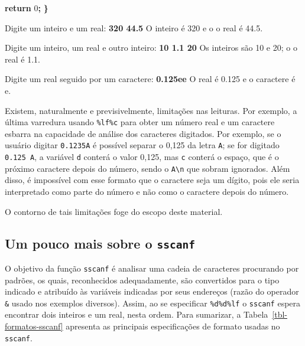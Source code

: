\documentclass[
  11pt,
  a4paper,
]{scrbook}
\newenvironment{Shaded}{\begin{snugshade}}{\end{snugshade}}
\newcommand{\ControlFlowTok}[1]{\textcolor[rgb]{0.13,0.29,0.53}{\textbf{#1}}}
\newcommand{\DecValTok}[1]{\textcolor[rgb]{0.00,0.00,0.81}{#1}}
\newcommand{\KeywordTok}[1]{\textcolor[rgb]{0.13,0.29,0.53}{\textbf{#1}}}
\newcommand{\NormalTok}[1]{#1}
\newcommand{\OperatorTok}[1]{\textcolor[rgb]{0.81,0.36,0.00}{\textbf{#1}}}
\begin{document}
\begin{Shaded}
\begin{Highlighting}[]
    \ControlFlowTok{return} \DecValTok{0}\OperatorTok{;}
\OperatorTok{\}}
\end{Highlighting}
\end{Shaded}

\begin{Shaded}
\begin{Highlighting}[]
\NormalTok{Digite um inteiro e um real: }\KeywordTok{ 320 44.5 }
\NormalTok{O inteiro é 320 e o o real é 44.5.}

\NormalTok{Digite um inteiro, um real e outro inteiro: }\KeywordTok{ 10 1.1 20 }
\NormalTok{Os inteiros são 10 e 20; o o real é 1.1.}

\NormalTok{Digite um real seguido por um caractere: }\KeywordTok{ 0.125ee }
\NormalTok{O real é 0.125 e o caractere é e.}
\end{Highlighting}
\end{Shaded}

Existem, naturalmente e previsivelmente, limitações nas leituras. Por
exemplo, a última varredura usando \texttt{\%lf\%c} para obter um número
real e um caractere esbarra na capacidade de análise dos caracteres
digitados. Por exemplo, se o usuário digitar \texttt{0.1235A} é possível
separar o 0,125 da letra \texttt{A}; se for digitado \texttt{0.125\ A},
a variável \texttt{d} conterá o valor 0,125, mas \texttt{c} conterá o
espaço, que é o próximo caractere depois do número, sendo o
\texttt{A\textbackslash{}n} que sobram ignorados. Além disso, é
impossível com esse formato que o caractere seja um dígito, pois ele
seria interpretado como parte do número e não como o caractere depois do
número.

O contorno de tais limitações foge do escopo deste material.

\subsection{\texorpdfstring{Um pouco mais sobre o
\texttt{sscanf}}{Um pouco mais sobre o sscanf}}\label{um-pouco-mais-sobre-o-sscanf}

O objetivo da função \texttt{sscanf} é analisar uma cadeia de caracteres
procurando por padrões, os quais, reconhecidos adequadamente, são
convertidos para o tipo indicado e atribuído às variáveis indicadas por
seus endereços (razão do operador \texttt{\&} usado nos exemplos
diversos). Assim, ao se especificar \texttt{\%d\%d\%lf} o
\texttt{sscanf} espera encontrar dois inteiros e um real, nesta ordem.
Para sumarizar, a Tabela~\ref{tbl-formatos-sscanf} apresenta as
principais especificações de formato usadas no \texttt{sscanf}.
\end{document}
